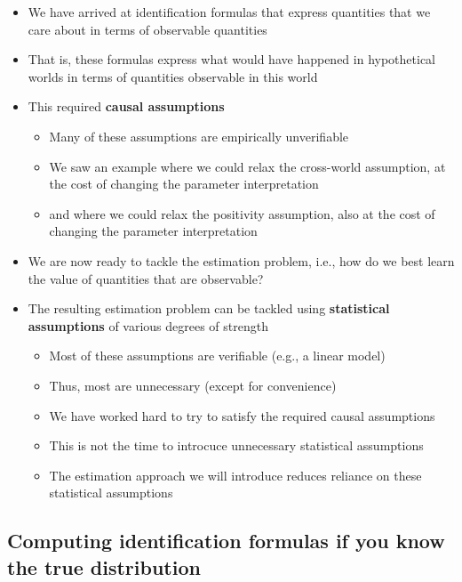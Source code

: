 \documentclass[
  12pt,
]{book}
\providecommand{\tightlist}{%
  \setlength{\itemsep}{0pt}\setlength{\parskip}{0pt}}
\theoremstyle{definition}
\theoremstyle{definition}
\theoremstyle{definition}
\newcommand{\1}{\mathbbm{1}}
\begin{document}
\begin{itemize}
\tightlist
\item
  We have arrived at identification formulas that express quantities that we
  care about in terms of observable quantities
\item
  That is, these formulas express what would have happened in hypothetical worlds in terms of quantities observable in this world
\item
  This required \textbf{causal assumptions}

  \begin{itemize}
  \tightlist
  \item
    Many of these assumptions are empirically unverifiable
  \item
    We saw an example where we could relax the cross-world assumption, at the
    cost of changing the parameter interpretation
  \item
    and where we could relax the positivity assumption, also at the cost of
    changing the parameter interpretation
  \end{itemize}
\item
  We are now ready to tackle the estimation problem, i.e., how do we best learn the value of quantities that are observable?
\item
  The resulting estimation problem can be tackled using \textbf{statistical
  assumptions} of various degrees of strength

  \begin{itemize}
  \tightlist
  \item
    Most of these assumptions are verifiable (e.g., a linear model)
  \item
    Thus, most are unnecessary (except for convenience)
  \item
    We have worked hard to try to satisfy the required causal assumptions
  \item
    This is not the time to introcuce unnecessary statistical assumptions
  \item
    The estimation approach we will introduce reduces reliance on these statistical
    assumptions
  \end{itemize}
\end{itemize}

\hypertarget{computing-identification-formulas-if-you-know-the-true-distribution}{%
\subsection{Computing identification formulas if you know the true distribution}\label{computing-identification-formulas-if-you-know-the-true-distribution}}
\end{document}

